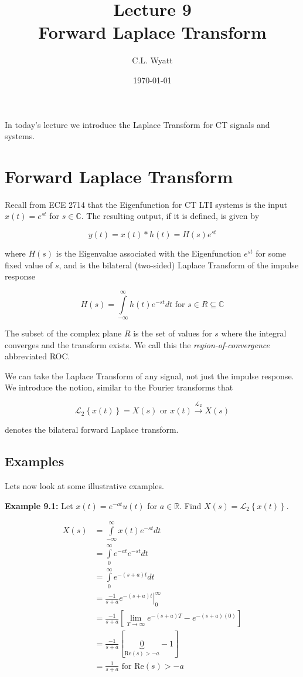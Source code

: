 \documentclass{article}
\begin{document}
\title{Lecture 9\\ Forward Laplace Transform}
\author{C.L. Wyatt}
\date{\today}
\maketitle

In today's lecture we introduce the Laplace Transform for CT signals and systems.

\section{Forward Laplace Transform}

Recall from ECE 2714 that the Eigenfunction for CT LTI systems is the input $x(t) = e^{st}$ for $s\in\mathbb{C}$. The resulting output, if it is defined, is given by

\[
y(t) = x(t)*h(t) = H(s) e^{st}
\]

where $H(s)$ is the Eigenvalue associated with the Eigenfunction $e^{st}$ for some fixed value of $s$, and is the bilateral (two-sided) Laplace Transform of the impulse response

\[
H(s) = \int\limits_{-\infty}^{\infty} h(t) e^{-st} dt \text{ for } s\in R \subseteq  \mathbb{C}
\]

The subset of the complex plane $R$ is the set of values for $s$ where the integral converges and the transform exists. We call this the \textit{region-of-convergence} abbreviated ROC.

We can take the Laplace Transform of any signal, not just the impulse response. We introduce the notion, similar to the Fourier transforms that

\[
\mathcal{L}_2\left\{ x(t) \right\} = X(s) \text{ or } x(t) \stackrel{\mathcal{L}_2}{\longrightarrow} X(s)
\]

denotes the bilateral forward Laplace transform.

\subsection{Examples}

Lets now look at some illustrative examples.

\textbf{Example 9.1:} Let $x(t) = e^{-at} u(t)$ for $a\in\mathbb{R}$. Find $X(s) = \mathcal{L}_2\left\{ x(t) \right\}$.

\begin{align}
  X(s) &= \int\limits_{-\infty}^{\infty} x(t) e^{-st} dt\\
  &= \int\limits_{0}^{\infty} e^{-at} e^{-st} dt\\
  &= \int\limits_{0}^{\infty} e^{-(s+a)t} dt\\
  &= \left. \frac{-1}{s+a} e^{-(s+a)t} \right|_{0}^{\infty}\\
  &= \frac{-1}{s+a} \left[\lim_{T\rightarrow \infty} e^{-(s+a)T} - e^{-(s+a)(0)} \right]\\
  &= \frac{-1}{s+a} \left[\underbrace{0}_{\text{Re}(s) > -a} - 1\right]\\
  &= \frac{1}{s+a} \text{ for Re}(s) > -a
\end{align}
\end{document}
